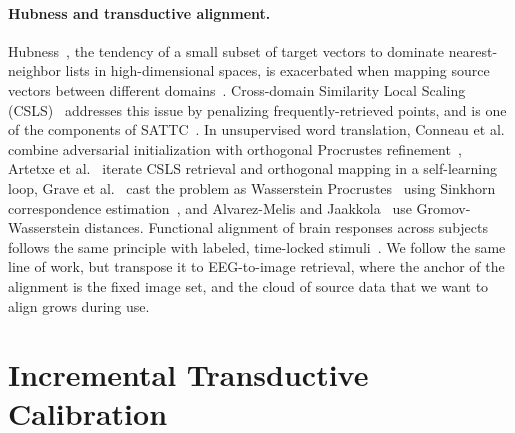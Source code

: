 \documentclass[10pt,twocolumn,letterpaper]{article}
\begin{document}
\paragraph{Hubness and transductive alignment.}
Hubness~\cite{radovanovic2010hubs}, the tendency of a small subset of target vectors to dominate nearest-neighbor lists in high-dimensional spaces, is exacerbated when mapping source vectors between different domains~\cite{dinu2015hubness}. Cross-domain Similarity Local Scaling (CSLS)~\cite{conneau2018muse} addresses this issue by penalizing frequently-retrieved points, and is one of the components of SATTC~\cite{huang2026sattc}.
In unsupervised word translation, Conneau et al.~\cite{conneau2018muse} combine adversarial initialization with orthogonal Procrustes refinement~\cite{schonemann1966procrustes}, Artetxe et al.~\cite{artetxe2018robust} iterate CSLS retrieval and orthogonal mapping in a self-learning loop, Grave et al.~\cite{grave2019wasserstein} cast the problem as Wasserstein Procrustes~\cite{peyre2019computational} using Sinkhorn correspondence estimation~\cite{cuturi2013sinkhorn}, and Alvarez-Melis and Jaakkola~\cite{alvarezmelis2018gromov} use Gromov-Wasserstein distances. Functional alignment of brain responses across subjects follows the same principle with labeled, time-locked stimuli~\cite{haxby2011common,chen2015srm,scotti2024mindeye2}. We follow the same line of work, but transpose it to EEG-to-image retrieval, where the anchor of the alignment is the fixed image set, and the cloud of source data that we want to align grows during use.

\section{Incremental Transductive Calibration}
\label{sec:setting}
\end{document}

